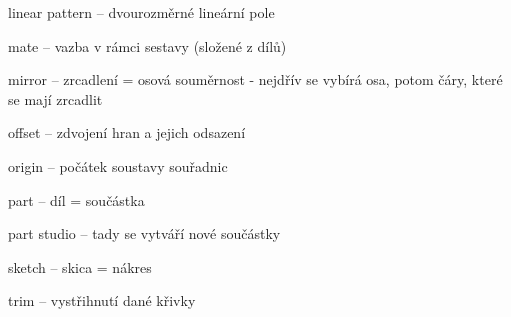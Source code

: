 linear pattern -- dvourozměrné lineární pole 

mate -- vazba v rámci sestavy (složené z dílů)

mirror -- zrcadlení = osová souměrnost - nejdřív se vybírá osa, potom čáry, které se mají zrcadlit

offset -- zdvojení hran a jejich odsazení 

origin -- počátek soustavy souřadnic

part -- díl = součástka

part studio -- tady se vytváří nové součástky 

sketch -- skica = nákres 

trim -- vystřihnutí dané křivky 










